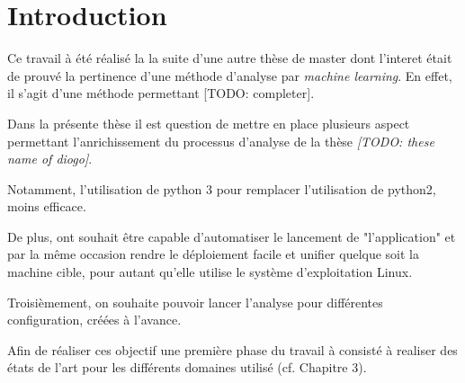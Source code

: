 \chapter{Introduction}
\label{ch:introduction}

Ce travail à été réalisé la la suite d'une autre thèse de master dont l'interet était de prouvé la pertinence d'une méthode d'analyse par \emph{machine learning}. En effet, il s'agit d'une méthode permettant [TODO: completer].

Dans la présente thèse il est question de mettre en place plusieurs aspect permettant l'anrichissement du processus d'analyse de la thèse \emph{[TODO: these name of diogo]}. 

Notamment, l'utilisation de python 3 pour remplacer l'utilisation de python2, moins efficace. %

De plus, ont souhait être capable d'automatiser le lancement de "l'application" et par la même occasion rendre le déploiement facile et unifier quelque soit la machine cible, pour autant qu'elle utilise le système d'exploitation Linux.

Troisièmement, on souhaite pouvoir lancer l'analyse pour différentes configuration, créées à l'avance.

Afin de réaliser ces objectif une première phase du travail à consisté à realiser des états de l'art pour les différents domaines utilisé (cf. Chapitre 3). %


